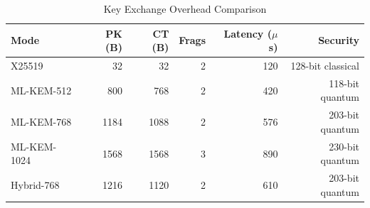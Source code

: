 \begin{table}[htbp]
\centering
\caption{Key Exchange Overhead Comparison}
\label{tab:ke-overhead}
\begin{tabular}{lrrrrr}
\hline
Mode & PK (B) & CT (B) & Frags & Latency ($\mu$s) & Security \\
\hline
X25519 & 32 & 32 & 2 & 120 & 128-bit classical \\
ML-KEM-512 & 800 & 768 & 2 & 420 & 118-bit quantum \\
ML-KEM-768 & 1184 & 1088 & 2 & 576 & 203-bit quantum \\
ML-KEM-1024 & 1568 & 1568 & 3 & 890 & 230-bit quantum \\
Hybrid-768 & 1216 & 1120 & 2 & 610 & 203-bit quantum \\
\hline
\end{tabular}
\end{table}

